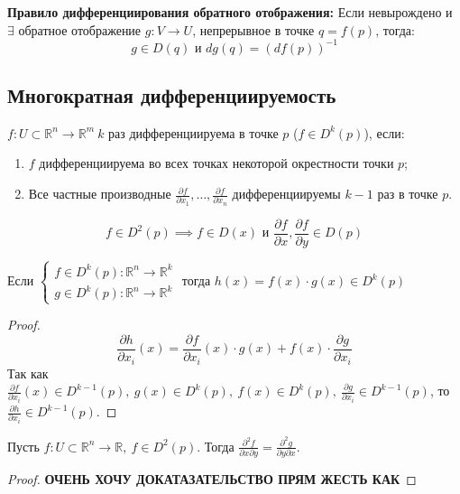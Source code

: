 \textbf{Правило дифференциирования обратного отображения:}
Если невырождено и $\exists$ обратное отображение $g:V \to U$, непрерывное в точке $q = f(p)$, тогда:
\[g \in D(q) \text{ и } dg(q) = (df(p))^{-1}\]


\subsection{Многократная дифференциируемость}

\begin{definition}
    $f: U \subset \mathbb{R}^n \to \mathbb{R}^m \ k$ раз дифференциируема в точке $p$ ($f \in D^k(p)$), если:
    \begin{enumerate}
        \item $f$ дифференциируема во всех точках некоторой окрестности точки $p$;
        \item Все частные производные $\frac{\partial f}{\partial x_1}, \dots, \frac{\partial f}{\partial x_n}$ дифференциируемы $k-1$ раз в точке $p$.
    \end{enumerate}  
\end{definition}

\begin{example}
    \[f \in D^2(p) \implies f \in D(x) \text{ и } \frac{\partial f}{\partial x}, \frac{\partial f}{\partial y} \in D(p)  \]
\end{example}

\begin{statement*}
    Если $\begin{cases}
        f \in D^k(p): \mathbb{R}^n \to \mathbb{R}^k\\
        g \in D^k(p): \mathbb{R}^n \to \mathbb{R}^k
    \end{cases}$ тогда $h(x) = f(x) \cdot g(x) \in D^k(p)$

    \begin{proof}
        \begin{equation*}
            \frac{\partial h}{\partial x_i}(x) = \frac{\partial f}{\partial x_i}(x)\cdot g(x) +
            f(x) \cdot \frac{\partial g}{\partial x_i}
        \end{equation*}
        Так как $\frac{\partial f}{\partial x_i}(x) \in D^{k-1}(p), \ g(x) \in D^k(p), \ f(x) \in D^k(p), \ \frac{\partial g}{\partial x_i} \in D^{k-1}(p)$,
        то $\frac{\partial h}{\partial x_i} \in D^{k-1}(p)$.
    \end{proof}
\end{statement*}


\begin{theorem}
    Пусть $f:U \subset \mathbb{R}^n \to \mathbb{R}, \ f \in D^2(p)$. Тогда $\frac{\partial^2 f}{\partial x \partial y} = \frac{\partial^2 g}{\partial y \partial x}$.
    \begin{proof}
        \textbf{ОЧЕНЬ ХОЧУ ДОКАТАЗАТЕЛЬСТВО ПРЯМ ЖЕСТЬ КАК}
    \end{proof}
\end{theorem}